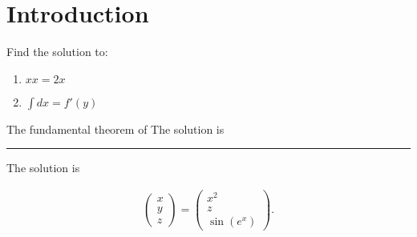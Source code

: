 \documentclass{lecturenotes}
\begin{document}
\section{Introduction}
\begin{example}
Find the solution to: 
\begin{enumerate}
    \item $xx = 2x$
    \item $\int dx = f'(y)$
\end{enumerate}
\end{example}



\begin{theorem}
The fundamental theorem of 
The solution is \rule{4em}{0.1em} 
\end{theorem}


The solution is  



\begin{align*}
\begin{pmatrix}x\\y\\z\end{pmatrix}
=\begin{pmatrix}x^2\\z\\\sin(e^x)\end{pmatrix}.
\end{align*}
\end{document}
